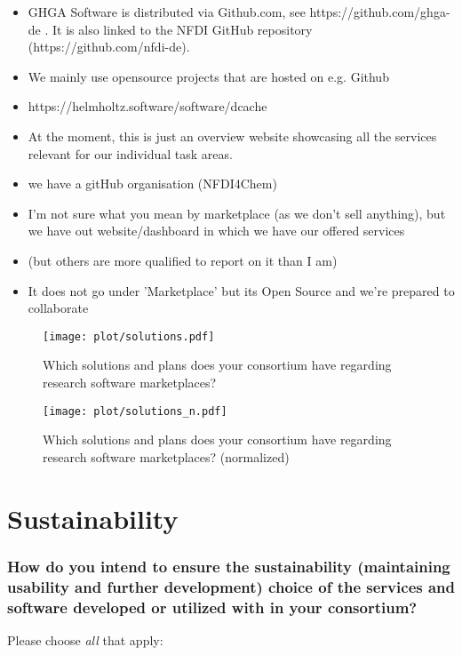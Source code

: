 \documentclass[headsepline,titlepage,twoside,12pt,toc=flat,headings=normal]{scrreprt}
\newcommand{\question}[1]{\subsubsection{#1}}
\begin{document}
\begin{itemize}
\item GHGA Software is distributed via Github.com, see https://github.com/ghga-de . It is also linked to the NFDI GitHub repository (https://github.com/nfdi-de).
\item We mainly use opensource projects that are hosted on e.g. Github
\item https://helmholtz.software/software/dcache
\item At the moment, this is just an overview website showcasing all the services relevant for our individual task areas.
\item we have a gitHub organisation (NFDI4Chem)
\item I'm not sure what you mean by marketplace (as we don't sell anything), but we have out website/dashboard in which we have our offered services
\item (but others are more qualified to report on it than I am)
\item It does not go under 'Marketplace' but its Open Source and we're prepared to collaborate
\end{itemize}

\vspace{-1em}
\begin{figure}[h!]
\caption{Which solutions and plans does your consortium have regarding research software marketplaces?}
\label{fig:solutions}
\texttt{[image: plot/solutions.pdf]}
\end{figure}

\vspace{-2em}
\begin{figure}[h!]
\caption{Which solutions and plans does your consortium have regarding research software marketplaces? (normalized)}
\label{fig:solutions_n}
\texttt{[image: plot/solutions\_n.pdf]}
\end{figure}

\clearpage
\section{Sustainability}
\question{How do you intend to ensure the sustainability (maintaining usability and further development) choice of the services and software developed or utilized with in your consortium?}
Please choose \emph{all} that apply:
\end{document}
